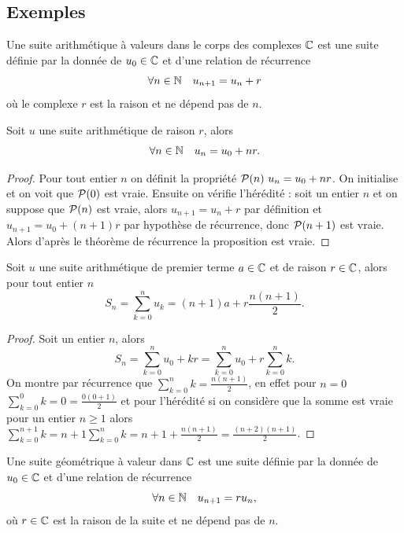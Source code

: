 \subsection{Exemples}
\begin{defdef}
  Une suite arithmétique à valeurs dans le corps des complexes \(\C\) est une suite définie par la donnée de \(u_0\in\C\) et d'une relation de récurrence 
  \begin{equation}
    \forall n \in \N \quad u_{n+1}=u_n+r
  \end{equation}
  où le complexe \(r\) est la raison et ne dépend pas de \(n\).
\end{defdef}
\begin{prop}
  Soit \(u\) une suite arithmétique de raison \(r\), alors
  \begin{equation}
    \forall n \in \N \quad u_n=u_0+nr.
  \end{equation}
\end{prop}
\begin{proof}
  Pour tout entier \(n\) on définit la propriété \(\P(n) \ u_n=u_0+nr\). On initialise et on voit que \(\P(0)\) est vraie. Ensuite on vérifie l'hérédité : soit un entier \(n\) et on suppose que \(\P(n)\) est vraie, alors \(u_{n+1}=u_n+r\) par définition et \(u_{n+1}=u_0+(n+1)r\) par hypothèse de récurrence, donc \(\P(n+1)\) est vraie. Alors d'après le théorème de récurrence la proposition est vraie.
\end{proof}
\begin{prop}
  Soit \(u\) une suite arithmétique de premier terme \(a\in\C\) et de raison \(r\in\C\), alors pour tout entier \(n\)
  \begin{equation}
    S_n=\sum_{k=0}^n u_k=(n+1)a+r\frac{n(n+1)}{2}.
  \end{equation}
\end{prop}
\begin{proof}
  Soit un entier \(n\), alors
  \begin{equation}
    S_n=\sum_{k=0}^n u_0+kr= \sum_{k=0}^n u_0 + r\sum_{k=0}^n k.
  \end{equation}
  On montre par récurrence que \(\sum_{k=0}^n k=\frac{n(n+1)}{2}\), en effet pour \(n=0\) \(\sum_{k=0}^0 k=0=\frac{0(0+1)}{2}\) et pour l'hérédité si on considère que la somme est vraie pour un entier \(n \geqslant 1\) alors \(\sum_{k=0}^{n+1} k= n+1 \sum_{k=0}^n k=n+1+\frac{n(n+1)}{2}=\frac{(n+2)(n+1)}{2}\).
\end{proof}
\begin{defdef}
  Une suite géométrique à valeur dans \(\C\) est une suite définie par la donnée de \(u_0\in\C\) et d'une relation de récurrence
  \begin{equation}
    \forall n \in \N \quad u_{n+1}=ru_n,
  \end{equation}
  où \(r\in\C\) est la raison de la suite et ne dépend pas de \(n\).
\end{defdef}
